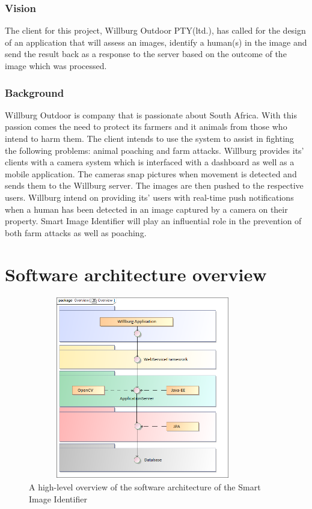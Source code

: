 \documentclass[a4paper,12pt]{report}
\begin{document}
 \subsubsection{Vision}
 The client for this project, Willburg Outdoor PTY(ltd.), has called for the design of an application that will assess an images, identify a human(s) in the image and send the result back as a response to the server based on the outcome of the image which was processed.

\subsubsection{Background}\hfill \break
Willburg Outdoor is company that is passionate about South Africa. With this passion comes the need to protect its farmers and it animals from those who intend to harm them. The client intends to use the system to assist in fighting the following problems: animal poaching and farm attacks. 
Willburg provides its' clients with a camera system which is interfaced with a dashboard as well as a mobile application. The cameras snap pictures when movement is detected and sends them to the Willburg server. The images are then pushed to the respective users. Willburg intend on providing its' users with real-time push notifications when a human has been detected in an image captured by a camera on their property. Smart Image Identifier will play an influential role in the prevention of both farm attacks as well as poaching.

\section {Software architecture overview}

	\begin{figure}[htb]
		\centering
		\includegraphics [height= 8cm, width=10cm]{../Diagrams/SystemOverview.png}
		\caption{A high-level overview of the software architecture of the Smart Image Identifier}
	\end{figure}
\end{document}
